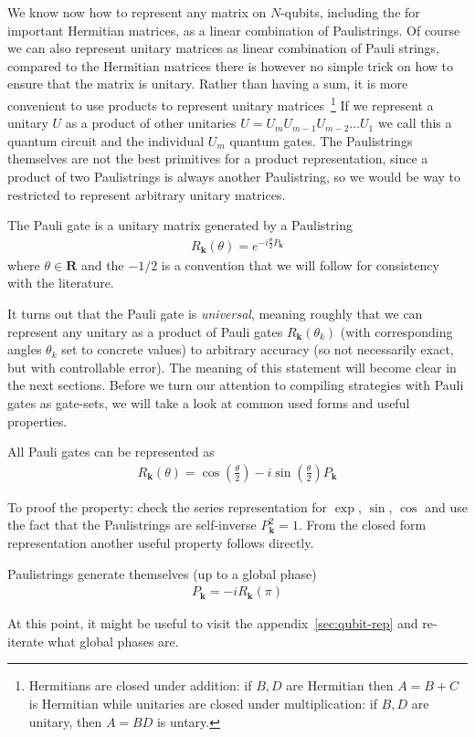 We know now how to represent any matrix on $N$-qubits, including the for important Hermitian matrices, as a linear combination of Paulistrings.
Of course we can also represent unitary matrices as linear combination of Pauli strings, compared to the Hermitian matrices there is however no simple trick on how to ensure that the matrix is unitary. 
Rather than having a sum, it is more convenient to use products to represent unitary matrices~\footnote{Hermitians are closed under addition: if $B,D$ are Hermitian then $A = B + C$ is Hermitian while unitaries are closed under multiplication: if $B,D$ are unitary, then $A = BD$ is untary.}
If we represent a unitary $U$ as a product of other unitaries $U=U_mU_{m-1}U_{m-2}\dots U_1$ we call this a quantum circuit and the individual $U_m$ quantum gates.
The Paulistrings themselves are not the best primitives for a product representation, since a product of two Paulistrings is always another Paulistring, so we would be way to restricted to represent arbitrary unitary matrices. 
\begin{def*}
    The Pauli gate is a unitary matrix generated by a Paulistring
    \begin{align}
        R_\mathbf{k}(\theta) = e^{-i\frac{\theta}{2} P_\mathbf{k}}
    \end{align}
    where $\theta \in \mathbf{R}$ and the $-1/2$ is a convention that we will follow for consistency with the literature.
\end{def*}
It turns out that the Pauli gate is \textit{universal}, meaning roughly that we can represent any unitary as a product of Pauli gates $R_\mathbf{k}(\theta_k)$ (with corresponding angles $\theta_k$ set to concrete values) to arbitrary accuracy (so not necessarily exact, but with controllable error).  
The meaning of this statement will become clear in the next sections.
Before we turn our attention to compiling strategies with Pauli gates as gate-sets, we will take a look at common used forms and useful properties. 
\begin{theorem*}
All Pauli gates can be represented as
\begin{align}
    R_\mathbf{k}(\theta) = \cos\left(\frac{\theta}{2}\right) -i \sin\left(\frac{\theta}{2}\right)P_\mathbf{k}
\end{align}
\end{theorem*}
To proof the property: check the series representation for $\exp$, $\sin$, $\cos$ and use the fact that the Paulistrings are self-inverse $P_\mathbf{k}^2=1$.
From the closed form representation another useful property follows directly.
\begin{theorem*}
Paulistrings generate themselves (up to a global phase)
\begin{align}
    P_\mathbf{k} = -i R_\mathbf{k}(\pi)
\end{align}
\end{theorem*}
At this point, it might be useful to visit the appendix~\ref{sec:qubit-rep} and re-iterate what global phases are.

